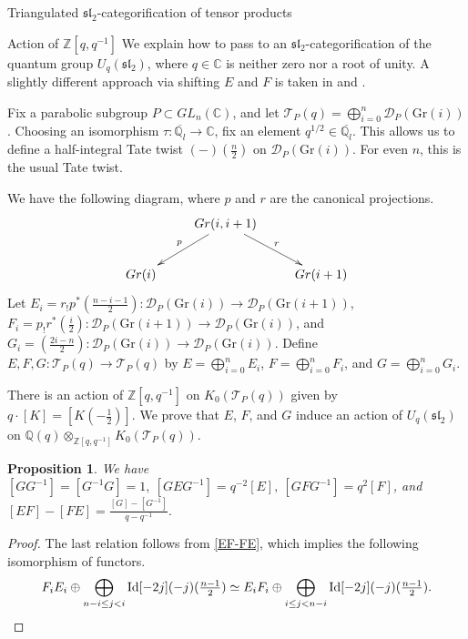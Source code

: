 \documentclass[12pt]{amsart}
\newtheorem{prpn}[thm]{Proposition}
\theoremstyle{definition}
\theoremstyle{remark}
\theoremstyle{remark}
\begin{document}
\begin{section}{Triangulated $\mathfrak{sl}_{2}$-categorification of tensor products}
\begin{subsection}{Action of $\mathbb{Z}[q,q^{-1}]$} \label{QuantResults} We explain how to pass to an $\mathfrak{sl}_{2}$-categorification of the quantum group $U_{q}(\mathfrak{sl}_{2})$, where $q \in \mathbb{C}$ is neither zero nor a root of unity. A slightly different approach via shifting $E$ and $F$ is taken in \cite{FrenkelKhovanovStroppelCategorificationFiniteDimensionalIrreducibleRepresentationsQuantumSl2TensorProducts} and \cite{ZhengGeometricCategorificationTensorProducts}. 

Fix a parabolic subgroup $P \subset GL_{n}(\mathbb{C})$, and let $\mathcal{T}_{P}(q) = \bigoplus_{i=0}^{n} \mathcal{D}_{P}(\text{Gr}(i))$. Choosing an isomorphism $\tau \colon \overline{\mathbb{Q}_{l}} \rightarrow \mathbb{C}$, fix an element $q^{1/2} \in \overline{\mathbb{Q}_{l}}$. This allows us to define a half-integral Tate twist $(-)(\frac{n}{2})$ on $\mathcal{D}_{P}(\text{Gr}(i))$. For even $n$, this is the usual Tate twist. 
  
We have the following diagram, where $p$ and $r$ are the canonical projections. \[ \xymatrix{ & Gr(i,i+1) \ar[dl]_{p} \ar[dr]^{r} & \\ Gr(i) & & Gr(i+1) } \] Let $E_{i} = r_{!}p^{*}(\frac{n-i-1}{2}) \colon \mathcal{D}_{P}(\text{Gr}(i)) \rightarrow \mathcal{D}_{P}(\text{Gr}(i+1))$, $F_{i} = p_{!} r^{*}(\frac{i}{2}) \colon \mathcal{D}_{P}(\text{Gr}(i+1)) \rightarrow \mathcal{D}_{P}(\text{Gr}(i))$, and $G_{i} = (\frac{2i-n}{2}) \colon \mathcal{D}_{P}(\text{Gr}(i)) \rightarrow \mathcal{D}_{P}(\text{Gr}(i))$. Define $E,F,G \colon \mathcal{T}_{P}(q) \rightarrow \mathcal{T}_{P}(q)$ by $E = \bigoplus_{i=0}^{n} E_{i}$, $F = \bigoplus_{i=0}^{n} F_{i}$, and $G = \bigoplus_{i=0}^{n} G_{i}$.

There is an action of $\mathbb{Z}[q,q^{-1}]$ on $K_{0}(\mathcal{T}_{P}(q))$ given by $q \cdot \left[ K \right] = \left[ K(-\frac{1}{2}) \right]$. We prove that $E$, $F$, and $G$ induce an action of $U_{q}(\mathfrak{sl}_{2})$ on $\mathbb{Q}(q) \otimes_{\mathbb{Z}[q,q^{-1}]} K_{0}(\mathcal{T}_{P}(q))$.

\begin{prpn} \label{QuantRelns} We have $\left[ GG^{-1}\right] = \left[ G^{-1}G \right] = 1, \  \left[ GEG^{-1}\right] = q^{-2}\left[ E \right], \ \left[ GFG^{-1} \right] = q^{2} \left[ F \right]$, and $\left[EF\right] - \left[FE\right] = \frac{\left[G\right] - [G^{-1}]}{q-q^{-1}}.$ \end{prpn}  

\begin{proof} The last relation follows from \ref{EF-FE}, which implies the following isomorphism of functors. \[ F_{i}E_{i} \oplus \bigoplus_{n-i \leq j < i} {\rm Id}[-2j](-j)(\tfrac{n-1}{2}) \simeq E_{i} F_{i} \oplus \bigoplus_{i \leq j < n-i} {\rm Id}[-2j](-j)(\tfrac{n-1}{2}). \] 


\end{proof}
\end{subsection}
\end{section}
\end{document}

